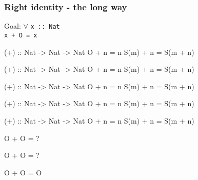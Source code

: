 \documentclass{beamer}
\newcommand{\ca}[1]{{\color{blue}#1}}
\newcommand{\cb}[1]{{\color{violet}#1}}
\begin{document}
\begin{frame}[t,fragile]
    \frametitle {Right identity - the long way}

Goal: $\forall$ \Verb?x :: Nat? \\
\quad \Verb?x + O = x?

\vspace{10pt}

\begin{overprint}

\begin{semiverbatim}
(+) :: Nat -> Nat -> Nat
O    + n = n
S(m) + n = S(m + n)
\end{semiverbatim}

\begin{semiverbatim}
(+) :: Nat -> Nat -> Nat
\ca{O}    + \cb{n} = n
S(m) + n = S(m + n)
\end{semiverbatim}

\begin{semiverbatim}
(+) :: Nat -> Nat -> Nat
\ca{O}    + \cb{n} = \cb{n}
S(m) + n = S(m + n)
\end{semiverbatim}

\begin{semiverbatim}
(+) :: Nat -> Nat -> Nat
O    + n = n
S(\ca{m}) + \cb{n} = S(m + n)
\end{semiverbatim}

\begin{semiverbatim}
(+) :: Nat -> Nat -> Nat
O    + n = n
S(\ca{m}) + \cb{n} = S(\ca{m} + \cb{n})
\end{semiverbatim}

\end{overprint}

\vspace{10pt}

\begin{center}
\begin{overprint}

\begin{semiverbatim}
O       + O = ?
\end{semiverbatim}

\begin{semiverbatim}
\ca{O}       + \cb{O} = ?
\end{semiverbatim}

\begin{semiverbatim}
O       + O = \cb{O}
\end{semiverbatim}


\end{overprint}
\end{center}
\end{frame}
\end{document}

